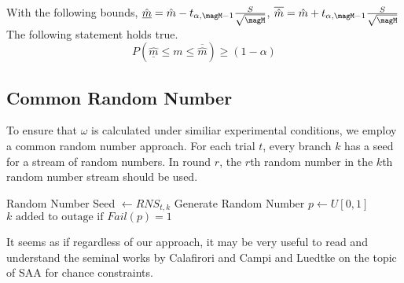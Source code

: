 With the following bounds, $ \underline{ \hat{m} } = \hat{m} - t_{\alpha,\magM-1} \frac{S}{\sqrt{\magM}} $, 
			$ \overline{ \hat{m} } = \hat{m} + t_{\alpha,\magM-1} \frac{S}{\sqrt{\magM}} $ \newline
The following statement holds true.
\begin{equation}
 P (  \underline{ \hat{m} } \leq m \leq  \overline{ \hat{m} } ) \geq (1-\alpha) 
\end{equation}


\subsection{Common Random Number}\label{crn}
 To ensure that $\omega$ is calculated under similiar experimental conditions, we employ a common random number approach.  For each trial $t$, every branch $k$ has a seed for a stream of random numbers.  In round $r$, the $r$th random number in the $k$th random number stream should be used.\\
 \begin{algorithmic}
 					\STATE Random Number Seed $ \gets RNS_{t,k} $
 							\STATE Generate Random Number
 					\ENDFOR
 					\STATE $p \gets U \left[ 0, 1\right] $
 					\STATE ${k} \mbox{ added to outage if } Fail(p) = 1 $
 		\ENDIF
 \ENDFOR
 \end{algorithmic}


It seems as if regardless of our approach, it may be very useful to
read and understand the seminal works by Calafirori and Campi and
Luedtke on the topic of SAA for chance constraints.
